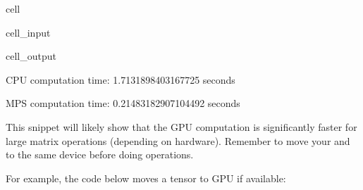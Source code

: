 \documentclass[letterpaper,10pt,english]{jupyterBook}
\begin{document}
\begin{sphinxuseclass}{cell}
\begin{sphinxVerbatimInput}
\begin{sphinxuseclass}{cell_input}
\begin{sphinxVerbatim}[commandchars=\\\{\}]
 
      
      
        
      
        
\end{sphinxVerbatim}

\end{sphinxuseclass}\end{sphinxVerbatimInput}
\begin{sphinxVerbatimOutput}

\begin{sphinxuseclass}{cell_output}
\begin{sphinxVerbatim}[commandchars=\\\{\}]
CPU computation time: 1.7131898403167725 seconds
\end{sphinxVerbatim}

\begin{sphinxVerbatim}[commandchars=\\\{\}]
MPS computation time: 0.21483182907104492 seconds
\end{sphinxVerbatim}

\end{sphinxuseclass}\end{sphinxVerbatimOutput}

\end{sphinxuseclass}
\sphinxAtStartPar
This snippet will likely show that the GPU computation is significantly faster for large matrix operations (depending on hardware). Remember to move your  and  to the same device before doing operations.

\sphinxAtStartPar
For example, the code below moves a tensor to GPU if available:
\end{document}
